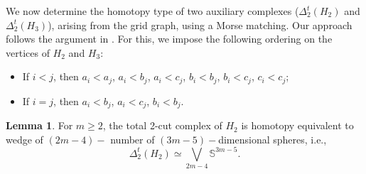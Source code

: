 \documentclass[11pt,reqno,a4paper]{amsart}
\theoremstyle{definition}
\theoremstyle{theorem}
\newtheorem{lemma}[theorem]{Lemma}
\newcommand{\lno}{\left(}
\newcommand{\rno}{\right)}
\newcommand{\bbS}{\mathbb{S}}
\theoremstyle{remark}
\begin{document}
We now determine the homotopy type of two auxiliary complexes ($\Delta_2^t \lno H_2 \rno$ and $\Delta_2^t \lno H_3 \rno$), arising from the grid graph, using a Morse matching. Our approach follows the argument in \cite[Theorem~4.16]{bayer2024total}. For this, we impose the following ordering on the vertices of $H_2$ and $H_3$:

\begin{itemize}
    \item If $i < j$, then $a_i < a_j$, $a_i < b_j$, $a_i < c_j$, $b_i < b_j$, $b_i < c_j$, $c_i < c_j$;
    \item If $i = j$, then $a_i < b_j$, $a_i < c_j$, $b_i < b_j$.
\end{itemize}
 
\begin{lemma}\label{thm: homotopy type of total 2-cut complex of (3×m)(1)}
    For $m \geq 2$, the total 2-cut complex of $H_2$ is homotopy equivalent to wedge of $\lno 2m-4 \rno-$ number of $\lno 3m-5 \rno-$dimensional spheres, i.e., $$\Delta_2^t \lno H_2 \rno \simeq \bigvee\limits_{2m-4}\bbS^{3m-5}.$$
\end{lemma}
\end{document}
